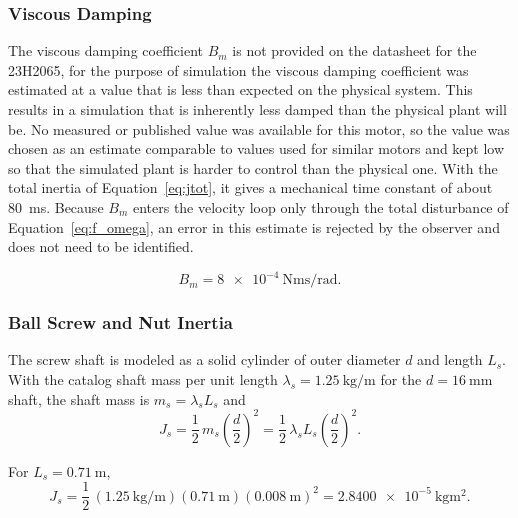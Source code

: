 \subsubsection{Viscous Damping}
The viscous damping coefficient $B_m$ is not provided on the datasheet for the 23H2065, for the purpose of simulation the viscous damping coefficient was estimated at a value that is less than expected on the physical system. This results in a simulation that is inherently less damped than the physical plant will be. No measured or published value was available for this motor, so the value was chosen as an estimate comparable to values used for similar motors and kept low so that the simulated plant is harder to control than the physical one. With the total inertia of Equation~\eqref{eq:jtot}, it gives a mechanical time constant of about \SI{80}{\milli\second}. Because $B_m$ enters the velocity loop only through the total disturbance of Equation~\eqref{eq:f_omega}, an error in this estimate is rejected by the observer and does not need to be identified. 

\begin{equation}
	B_m = \SI{8e-4}{\newton\meter\second\per\radian}.
	\label{eq:Bm}
\end{equation}

\subsubsection{Ball Screw and Nut Inertia}

The screw shaft is modeled as a solid cylinder of outer diameter $d$ and
length $L_s$. With the catalog shaft mass per unit length
$\lambda_s = \SI{1.25}{\kilo\gram\per\meter}$ for the $d=\SI{16}{\milli\meter}$
shaft, the shaft mass is $m_s = \lambda_s L_s$ \cite{thk_ball_screw} and
\begin{equation}
	J_s = \frac{1}{2}\, m_s \left(\frac{d}{2}\right)^{2}
	= \frac{1}{2}\, \lambda_s L_s \left(\frac{d}{2}\right)^{2}.
	\label{eq:Js}
\end{equation}

For $L_s = \SI{0.71}{\meter}$,
\begin{equation}
	J_s = \frac{1}{2}\,(\SI{1.25}{\kilo\gram\per\meter})(\SI{0.71}{\meter})
	(\SI{0.008}{\meter})^{2}
	= \SI{2.8400e-5}{\kilo\gram\meter\squared}.
\end{equation}



